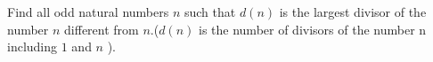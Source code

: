 Find all odd natural numbers $n$ such that $d(n)$ is the largest divisor of the number $n$ different from $n$.($d(n)$ is the number of divisors of the number n including $1$ and $n$ ).